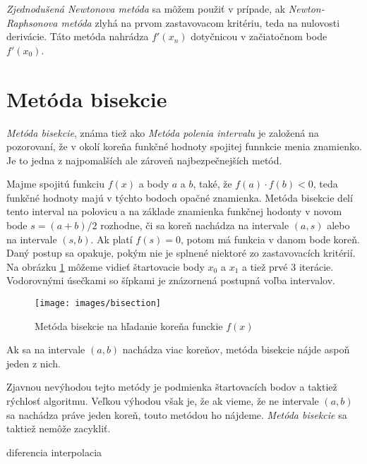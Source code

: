 \textit{Zjednodušená Newtonova metóda} sa môžem použiť v prípade, ak \textit{Newton-Raphsonova metóda} zlyhá na prvom 
zastavovacom kritériu, teda na nulovosti derivácie. Táto metóda nahrádza $f'(x_n)$ dotyčnicou v začiatočnom bode $f'(x_0)$.  

\section{Metóda bisekcie}

\textit{Metóda bisekcie}, známa tiež ako \textit{Metóda polenia intervalu} je založená 
na pozorovaní, že v okolí koreňa funkčné hodnoty spojitej funnkcie menia znamienko. 
Je to jedna z najpomalších ale zároveň najbezpečnejších metód.

Majme spojitú funkciu $f(x)$ a body $a$ a $b$, také, že $f(a) \cdot f(b) < 0$, teda 
funkčné hodnoty majú v týchto bodoch opačné znamienka. Metóda bisekcie delí tento 
interval na polovicu a na základe znamienka funkčnej hodonty v novom bode $s = (a+b)/2$
rozhodne, či sa koreň nachádza na intervale $(a, s)$ alebo na intervale $(s, b)$. 
Ak platí $f(s) = 0$, potom má funkcia v danom bode koreň. Daný postup sa opakuje, 
pokým nie je splnené niektoré zo zastavovacích kritérií. Na obrázku \ref{obr:bisection}
môžeme vidieť štartovacie body $x_0$ a $x_1$ a tiež prvé 3 iterácie. Vodorovnými
úsečkami so šípkami je znázornená postupná voľba intervalov. 

\begin{figure}
    \centerline{\texttt{[image: images/bisection]}}
    \caption[Metóda bisekcie na hľadanie koreňa funckie $f(x)$]{Metóda bisekcie na hľadanie koreňa funckie $f(x)$}
    \label{obr:bisection}
\end{figure}

Ak sa na intervale $(a, b)$ nachádza viac koreňov, metóda bisekcie nájde aspoň jeden z nich.

Zjavnou nevýhodou tejto metódy je podmienka štartovacích bodov a taktiež rýchlosť algoritmu. 
Veľkou výhodou však je, že ak vieme, že ne intervale $(a, b)$ sa nachádza práve jeden koreň, 
touto metódou ho nájdeme. \textit{Metóda bisekcie} sa taktiež nemôže zacykliť.

diferencia
interpolacia
